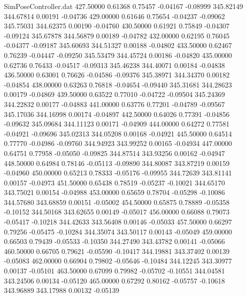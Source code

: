 \begin{filecontents}{SimPoseController.dat}
 427.50000    0.61368    0.75457    -0.04167   -0.08999  345.82149  344.67814    0.00191   -0.04736
 429.00000    0.61646    0.75654    -0.04237   -0.09062  345.75031  344.62375    0.00190   -0.04760
 430.50000    0.61921    0.75849    -0.04307   -0.09124  345.67878  344.56879    0.00189   -0.04782
 432.00000    0.62195    0.76045    -0.04377   -0.09187  345.60693  344.51327    0.00188   -0.04802
 433.50000    0.62467    0.76239    -0.04447   -0.09250  345.53479  344.45724    0.00186   -0.04820
 435.00000    0.62736    0.76433    -0.04517   -0.09313  345.46238  344.40071    0.00184   -0.04838
 436.50000    0.63001    0.76626    -0.04586   -0.09376  345.38971  344.34370    0.00182   -0.04854
 438.00000    0.63263    0.76818    -0.04654   -0.09440  345.31681  344.28623    0.00179   -0.04869
 439.50000    0.63522    0.77010    -0.04722   -0.09504  345.24369  344.22832    0.00177   -0.04883
 441.00000    0.63776    0.77201    -0.04789   -0.09567  345.17036  344.16998    0.00174   -0.04897
 442.50000    0.64026    0.77391    -0.04856   -0.09632  345.09684  344.11123    0.00171   -0.04909
 444.00000    0.64272    0.77581    -0.04921   -0.09696  345.02313  344.05208    0.00168   -0.04921
 445.50000    0.64514    0.77770    -0.04986   -0.09760  344.94923  343.99252    0.00165   -0.04934
 447.00000    0.64751    0.77958    -0.05050   -0.09825  344.87514  343.93256    0.00162   -0.04947
 448.50000    0.64984    0.78146    -0.05113   -0.09890  344.80087  343.87219    0.00159   -0.04960
 450.00000    0.65213    0.78333    -0.05176   -0.09955  344.72639  343.81141    0.00157   -0.04973
 451.50000    0.65438    0.78519    -0.05237   -0.10021  344.65170  343.75021    0.00154   -0.04988
 453.00000    0.65659    0.78704    -0.05298   -0.10086  344.57680  343.68859    0.00151   -0.05002
 454.50000    0.65875    0.78889    -0.05358   -0.10152  344.50168  343.62655    0.00149   -0.05017
 456.00000    0.66088    0.79073    -0.05417   -0.10218  344.42633  343.56408    0.00146   -0.05033
 457.50000    0.66297    0.79256    -0.05475   -0.10284  344.35074  343.50117    0.00143   -0.05049
 459.00000    0.66503    0.79439    -0.05533   -0.10350  344.27490  343.43782    0.00141   -0.05066
 460.50000    0.66705    0.79621    -0.05590   -0.10417  344.19881  343.37402    0.00139   -0.05083
 462.00000    0.66904    0.79802    -0.05646   -0.10484  344.12245  343.30977    0.00137   -0.05101
 463.50000    0.67099    0.79982    -0.05702   -0.10551  344.04581  343.24506    0.00134   -0.05120
 465.00000    0.67292    0.80162    -0.05757   -0.10618  343.96889  343.17988    0.00132   -0.05139

\end{filecontents}
